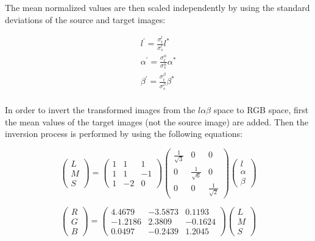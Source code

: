 \documentclass{nitk}
\begin{document}
The mean normalized values are then scaled independently by using the standard deviations of the source and target images:


\begin{equation}
    \begin{array}{l}
    l^{'} = \frac{\sigma_{t}^{l}}{\sigma_{s}^{l}}l^{*} \\
    \alpha^{'} = \frac{\sigma_{t}^{\alpha}}{\sigma_{s}^{\alpha}}\alpha^{*} \\
    \beta^{'} = \frac{\sigma_{t}^{\beta}}{\sigma_{s}^{\beta}}\beta^{*} \\
    \end{array}
\end{equation}
    
In order to invert the transformed images from the $l\alpha\beta$ space to RGB space, first the mean values of the target images (not the source image) are added. Then the inversion process is performed by using the following equations:    
    
\begin{equation}
    \begin{pmatrix} L \\ M \\ S \end{pmatrix} =
    \begin{pmatrix} 1 & 1 & 1 \\ 1 & 1 & -1 \\ 1 & -2 & 0 \end{pmatrix}
    \begin{pmatrix} \frac{1}{\sqrt{3}} & 0 & 0 \\ 0 & \frac{1}{\sqrt{6}} & 0 \\ 0 & 0 & \frac{1}{\sqrt{2}} \end{pmatrix}
    \begin{pmatrix} l \\ \alpha \\ \beta \end{pmatrix}
\end{equation}

\begin{equation}
    \begin{pmatrix} R \\ G \\ B \end{pmatrix} = 
    \begin{pmatrix} 4.4679 & -3.5873 & 0.1193 \\ -1.2186 & 2.3809 & -0.1624 \\ 0.0497 & -0.2439 & 1.2045 \end{pmatrix}
    \begin{pmatrix} L \\ M \\ S \end{pmatrix}
\end{equation}
\end{document}
